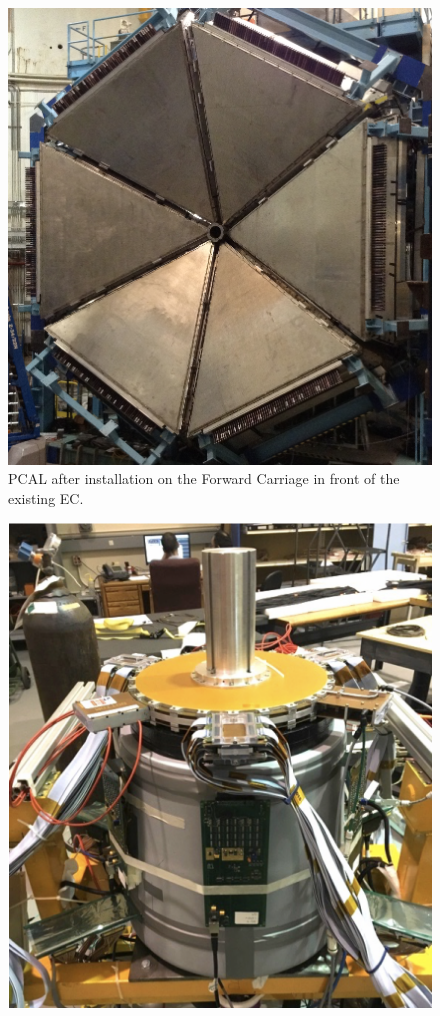 \documentclass[final,3p]{elsarticle}
\begin{document}
\begin{twocolumn}
\begin{figure}[tp!]
\centerline{\includegraphics[width=0.95\columnwidth]{PCAL.png}}
\caption{PCAL after installation on the Forward Carriage in front of the existing EC.}
\label{ec-pcal}
\end{figure}
\begin{figure}[t!]
\centerline{\includegraphics[width=0.70\columnwidth]{FT-photo.png}}

\end{figure}
\end{twocolumn}
\end{document}
